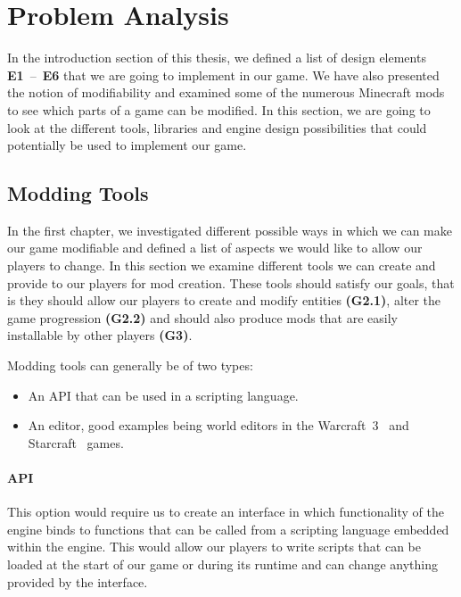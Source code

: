 \chapter{Problem Analysis}

In the introduction section of this thesis, we defined a list of design elements \textbf{E1}~--~\textbf{E6} that we are going to
implement in our game. We have also presented the notion of modifiability and examined some of
the numerous Minecraft mods to see which parts of a game can be modified. In this section, we are
going to look at the different tools, libraries and engine design possibilities that could potentially
be used to implement our game.

\section{Modding Tools}

In the first chapter, we investigated different possible ways in which we can make our game modifiable and defined a list of aspects
we would like to allow our players to change. In this section we examine different tools we can create and provide to our players
for mod creation. These tools should satisfy our goals, that is they should allow our players to create and modify
entities \textbf{(G2.1)}, alter the game progression \textbf{(G2.2)} and should also produce mods that are easily installable
by other players \textbf{(G3)}.

Modding tools can generally be of two types:
\begin{itemize}
    \item An API that can be used in a scripting language.
    \item An editor, good examples being world editors in the Warcraft~3~\cite{WC3} and
        Starcraft~\cite{SC} games.
\end{itemize}

\subsubsection{API}

This option would require us to create an interface in which functionality of the engine binds to functions that can be called
from a scripting language embedded within the engine. This would allow our players to write scripts that can be loaded at the
start of our game or during its runtime and can change anything provided by the interface.

